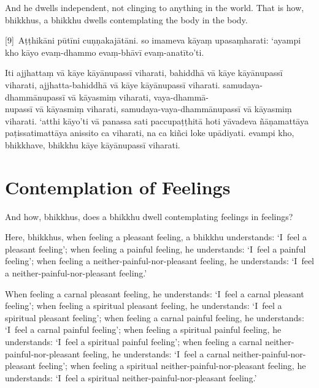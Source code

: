 And he dwells independent, not clinging to anything in the world. That is how,
bhikkhus, a bhikkhu dwells contemplating the body in the body.



\paliPage

[9]~Aṭṭhikāni pūtīni cuṇṇakajātāni. so imameva kāyaṃ upasaṃharati: ‘ayampi kho
kāyo evaṃ-dhammo evaṃ-bhāvī evaṃ-anatīto’ti.

Iti ajjhattaṃ vā kāye kāyānupassī viharati, bahiddhā vā kāye kāyānupassī
viharati, ajjhatta-bahiddhā vā kāye kāyānupassī viharati. samudaya-dhammānupassī
vā kāyasmiṃ viharati, vaya-dhammā-\\
nupassī vā kāyasmiṃ viharati, samudaya-vaya-dhammānupassī vā kāyasmiṃ viharati.
‘atthi kāyo’ti vā panassa sati paccupaṭṭhitā hoti yāvadeva ñāṇamattāya
paṭissatimattāya anissito ca viharati, na ca kiñci loke upādiyati. evampi kho,
bhikkhave, bhikkhu kāye kāyānupassī viharati.



\englishPage
\chapter{Contemplation of Feelings}

And how, bhikkhus, does a bhikkhu dwell contemplating feelings in feelings?

Here, bhikkhus, when feeling a pleasant feeling, a bhikkhu understands:
`I~feel a pleasant feeling';
when feeling a painful feeling, he understands:
`I~feel a painful feeling';
when feeling a neither-painful-nor-pleasant feeling, he understands:
`I~feel a neither-painful-nor-pleasant feeling.'

When feeling a carnal pleasant feeling, he understands:
`I~feel a carnal pleasant feeling';
when feeling a spiritual pleasant feeling, he understands:
`I~feel a spiritual pleasant feeling';
when feeling a carnal painful feeling, he understands:
`I~feel a carnal painful feeling';
when feeling a spiritual painful feeling, he understands:
`I~feel a spiritual painful feeling';
when feeling a carnal neither-painful-nor-pleasant feeling, he understands:
`I~feel a carnal neither-painful-nor-pleasant feeling';
when feeling a spiritual neither-painful-nor-pleasant feeling, he understands:
`I~feel a spiritual neither-painful-nor-pleasant feeling.'

